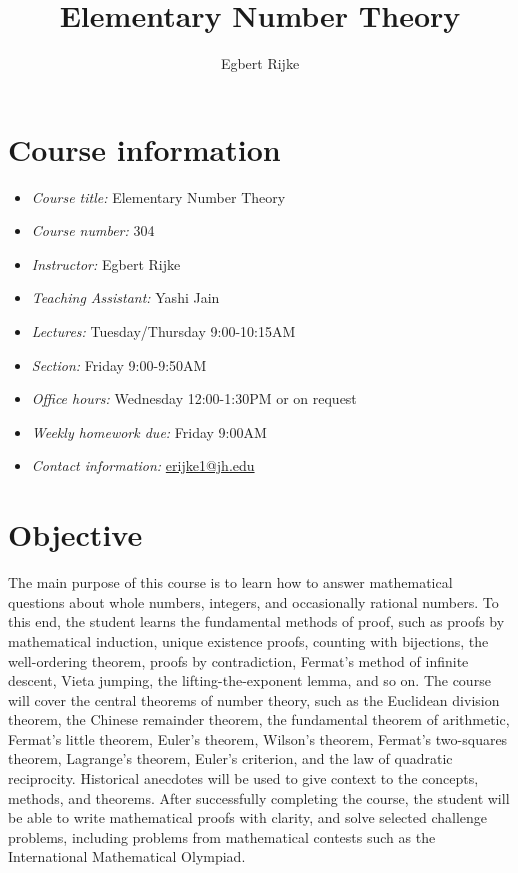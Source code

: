 \documentclass{article}
\title{Elementary Number Theory}
\author{Egbert Rijke}
\begin{document}
\maketitle

\section*{Course information}
\begin{itemize}[label={},left=0pt, itemindent=0pt]
\item \emph{Course title:} Elementary Number Theory
\item \emph{Course number:} 304
\item \emph{Instructor:} Egbert Rijke
\item \emph{Teaching Assistant:} Yashi Jain
\item \emph{Lectures:} Tuesday/Thursday 9:00-10:15AM
\item \emph{Section:} Friday 9:00-9:50AM
\item \emph{Office hours:} Wednesday 12:00-1:30PM or on request
\item \emph{Weekly homework due:} Friday 9:00AM
\item \emph{Contact information:} \href{mailto:erijke1@jh.edu}{erijke1@jh.edu}
\end{itemize}

\section*{Objective}

The main purpose of this course is to learn how to answer mathematical questions about whole numbers, integers, and occasionally rational numbers. To this end, the student learns the fundamental methods of proof, such as proofs by mathematical induction, unique existence proofs, counting with bijections, the well-ordering theorem, proofs by contradiction, Fermat's method of infinite descent, Vieta jumping, the lifting-the-exponent lemma, and so on. The course will cover the central theorems of number theory, such as the Euclidean division theorem, the Chinese remainder theorem, the fundamental theorem of arithmetic, Fermat's little theorem, Euler's theorem, Wilson's theorem, Fermat's two-squares theorem, Lagrange's theorem, Euler's criterion, and the law of quadratic reciprocity. Historical anecdotes will be used to give context to the concepts, methods, and theorems. After successfully completing the course, the student will be able to write mathematical proofs with clarity, and solve selected challenge problems, including problems from mathematical contests such as the International Mathematical Olympiad.
\end{document}
